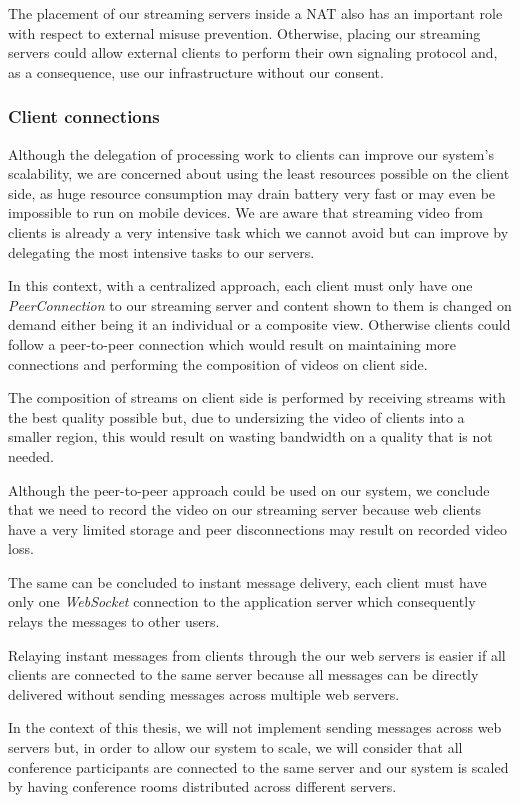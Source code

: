 \documentclass[conference,compsoc,a4paper]{IEEEtran}
\begin{document}
The placement of our streaming servers inside a \gls{NAT} also has an important role with respect to external misuse prevention. Otherwise, placing our streaming servers could allow external clients to perform their own signaling protocol and, as a consequence, use our infrastructure without our consent.

\subsubsection{Client connections}
	Although the delegation of processing work to clients can improve our system's scalability, we are concerned about using the least resources possible on the client side, as huge resource consumption may drain battery very fast or may even be impossible to run on mobile devices. We are aware that streaming video from clients is already a very intensive task which we cannot avoid but can improve by delegating the most intensive tasks to our servers. 


	In this context, with a centralized approach, each client must only have one \emph{PeerConnection} to our streaming server and content shown to them is changed on demand either being it an individual or a composite view. Otherwise clients could follow a peer-to-peer connection which would result on maintaining more connections and performing the composition of videos on client side.

	The composition of streams on client side is performed by receiving streams with the best quality possible but, due to undersizing the video of clients into a smaller region, this would result on wasting bandwidth on a quality that is not needed.

	Although the peer-to-peer approach could be used on our system, we conclude that we need to record the video on our streaming server because web clients have a very limited storage and peer disconnections may result on recorded video loss. 

	The same can be concluded to instant message delivery, each client must have only one \emph{WebSocket} connection to the application server which consequently relays the messages to other users.

	Relaying instant messages from clients through the our web servers is easier if all clients are connected to the same server because all messages can be directly delivered without sending messages across multiple web servers. 

	In the context of this thesis, we will not implement sending messages across web servers but, in order to allow our system to scale, we will consider that all conference participants are connected to the same server and our system is scaled by having conference rooms distributed across different servers.
\end{document}
